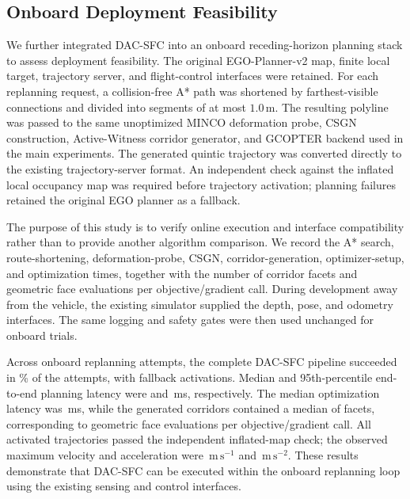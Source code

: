 \subsection{Onboard Deployment Feasibility}
\label{sec:onboard_deployment}

We further integrated DAC-SFC into an onboard receding-horizon planning stack
to assess deployment feasibility.  The original EGO-Planner-v2 map, finite
local target, trajectory server, and flight-control interfaces were retained.
For each replanning request, a collision-free A* path was shortened by
farthest-visible connections and divided into segments of at most
$1.0\,\mathrm{m}$.  The resulting polyline was passed to the same unoptimized
MINCO deformation probe, CSGN construction, Active-Witness corridor generator,
and GCOPTER backend used in the main experiments.  The generated quintic
trajectory was converted directly to the existing trajectory-server format.
An independent check against the inflated local occupancy map was required
before trajectory activation; planning failures retained the original EGO
planner as a fallback.

The purpose of this study is to verify online execution and interface
compatibility rather than to provide another algorithm comparison.  We record
the A* search, route-shortening, deformation-probe, CSGN, corridor-generation,
optimizer-setup, and optimization times, together with the number of corridor
facets and geometric face evaluations per objective/gradient call.  During
development away from the vehicle, the existing simulator supplied the depth,
pose, and odometry interfaces.  The same logging and safety gates were then
used unchanged for onboard trials.

Across  onboard replanning attempts, the complete DAC-SFC
pipeline succeeded in \% of the attempts, with
 fallback activations.  Median and 95th-percentile
end-to-end planning latency were  and
\,ms, respectively.  The median optimization latency was
\,ms, while the generated corridors contained a median
of  facets, corresponding to
 geometric face evaluations per
objective/gradient call.  All activated trajectories passed the independent
inflated-map check; the observed maximum velocity and acceleration were
\,$\mathrm{m\,s^{-1}}$ and
\,$\mathrm{m\,s^{-2}}$.  These results demonstrate
that DAC-SFC can be executed within the onboard replanning loop using the
existing sensing and control interfaces.
